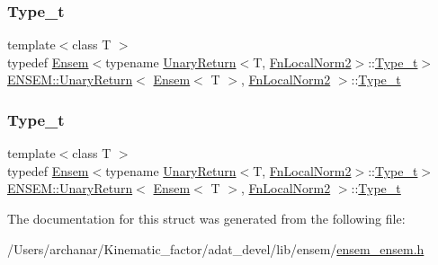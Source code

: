 \subsubsection{\texorpdfstring{Type\_t}{Type\_t}\hspace{0.1cm}{\footnotesize\ttfamily [1/2]}}
{\footnotesize\ttfamily template$<$class T $>$ \\
typedef \mbox{\hyperlink{classENSEM_1_1Ensem}{Ensem}}$<$typename \mbox{\hyperlink{structENSEM_1_1UnaryReturn}{Unary\+Return}}$<$T, \mbox{\hyperlink{structENSEM_1_1FnLocalNorm2}{Fn\+Local\+Norm2}}$>$\+::\mbox{\hyperlink{structENSEM_1_1UnaryReturn_3_01Ensem_3_01T_01_4_00_01FnLocalNorm2_01_4_a683bc7aab1651cd6ec3d3ccb81a0df5f}{Type\+\_\+t}}$>$ \mbox{\hyperlink{structENSEM_1_1UnaryReturn}{E\+N\+S\+E\+M\+::\+Unary\+Return}}$<$ \mbox{\hyperlink{classENSEM_1_1Ensem}{Ensem}}$<$ T $>$, \mbox{\hyperlink{structENSEM_1_1FnLocalNorm2}{Fn\+Local\+Norm2}} $>$\+::\mbox{\hyperlink{structENSEM_1_1UnaryReturn_3_01Ensem_3_01T_01_4_00_01FnLocalNorm2_01_4_a683bc7aab1651cd6ec3d3ccb81a0df5f}{Type\+\_\+t}}}

\mbox{\label{structENSEM_1_1UnaryReturn_3_01Ensem_3_01T_01_4_00_01FnLocalNorm2_01_4_a683bc7aab1651cd6ec3d3ccb81a0df5f}} 
\subsubsection{\texorpdfstring{Type\_t}{Type\_t}\hspace{0.1cm}{\footnotesize\ttfamily [2/2]}}
{\footnotesize\ttfamily template$<$class T $>$ \\
typedef \mbox{\hyperlink{classENSEM_1_1Ensem}{Ensem}}$<$typename \mbox{\hyperlink{structENSEM_1_1UnaryReturn}{Unary\+Return}}$<$T, \mbox{\hyperlink{structENSEM_1_1FnLocalNorm2}{Fn\+Local\+Norm2}}$>$\+::\mbox{\hyperlink{structENSEM_1_1UnaryReturn_3_01Ensem_3_01T_01_4_00_01FnLocalNorm2_01_4_a683bc7aab1651cd6ec3d3ccb81a0df5f}{Type\+\_\+t}}$>$ \mbox{\hyperlink{structENSEM_1_1UnaryReturn}{E\+N\+S\+E\+M\+::\+Unary\+Return}}$<$ \mbox{\hyperlink{classENSEM_1_1Ensem}{Ensem}}$<$ T $>$, \mbox{\hyperlink{structENSEM_1_1FnLocalNorm2}{Fn\+Local\+Norm2}} $>$\+::\mbox{\hyperlink{structENSEM_1_1UnaryReturn_3_01Ensem_3_01T_01_4_00_01FnLocalNorm2_01_4_a683bc7aab1651cd6ec3d3ccb81a0df5f}{Type\+\_\+t}}}



The documentation for this struct was generated from the following file\+:\begin{DoxyCompactItemize}
\item 
/\+Users/archanar/\+Kinematic\+\_\+factor/adat\+\_\+devel/lib/ensem/\mbox{\hyperlink{lib_2ensem_2ensem__ensem_8h}{ensem\+\_\+ensem.\+h}}\end{DoxyCompactItemize}
